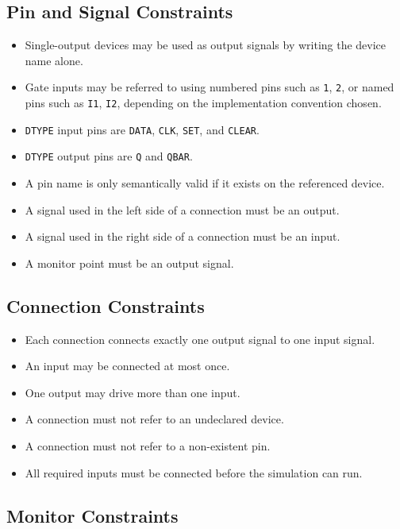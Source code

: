 \documentclass[10pt,a4paper]{article}
\begin{document}
\subsection{Pin and Signal Constraints}

\begin{itemize}
    \item Single-output devices may be used as output signals by writing the
    device name alone.
    \item Gate inputs may be referred to using numbered pins such as
    \texttt{1}, \texttt{2}, or named pins such as \texttt{I1}, \texttt{I2},
    depending on the implementation convention chosen.
    \item \texttt{DTYPE} input pins are \texttt{DATA}, \texttt{CLK},
    \texttt{SET}, and \texttt{CLEAR}.
    \item \texttt{DTYPE} output pins are \texttt{Q} and \texttt{QBAR}.
    \item A pin name is only semantically valid if it exists on the referenced
    device.
    \item A signal used in the left side of a connection must be an output.
    \item A signal used in the right side of a connection must be an input.
    \item A monitor point must be an output signal.
\end{itemize}

\subsection{Connection Constraints}

\begin{itemize}
    \item Each connection connects exactly one output signal to one input
    signal.
    \item An input may be connected at most once.
    \item One output may drive more than one input.
    \item A connection must not refer to an undeclared device.
    \item A connection must not refer to a non-existent pin.
    \item All required inputs must be connected before the simulation can run.
\end{itemize}

\subsection{Monitor Constraints}
\end{document}
